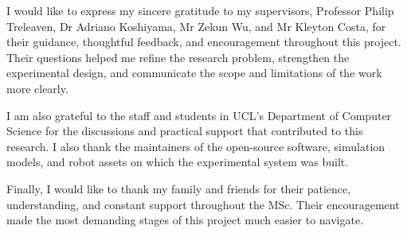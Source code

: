 \begin{abstract}
\begin{enumerate}[leftmargin=*,labelsep=.8em,nosep]
  \item \textbf{Behavioural evidence for driver inspection and repair.}
  Independent validation provides measurements and failure diagnostics that
  help developers identify unmet requirements and guide driver repair before
  downstream task execution.

  \item \textbf{Evidence for model selection.}
  The benchmark reports behavioural performance alongside estimated model
  usage costs and elapsed time for each role. These measurements inform model
  selection and resource allocation within the evaluated conditions.

\end{enumerate}


\end{abstract}

\begin{acknowledgements}
I would like to express my sincere gratitude to my supervisors,
Professor Philip Treleaven, Dr Adriano Koshiyama, Mr Zekun Wu, and
Mr Kleyton Costa, for their guidance, thoughtful feedback, and encouragement
throughout this project. Their questions helped me refine the research problem,
strengthen the experimental design, and communicate the scope and limitations
of the work more clearly.

I am also grateful to the staff and students in UCL's Department of Computer
Science for the discussions and practical support that contributed to this
research. I also thank the maintainers of the open-source software, simulation
models, and robot assets on which the experimental system was built.

Finally, I would like to thank my family and friends for their patience,
understanding, and constant support throughout the MSc. Their encouragement
made the most demanding stages of this project much easier to navigate.
\end{acknowledgements}

\setcounter{tocdepth}{2}

\tableofcontents
\listoffigures
\listoftables
